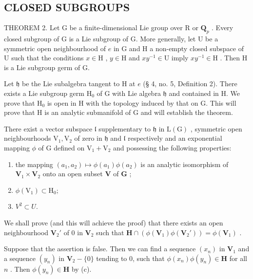 \subsection{CLOSED SUBGROUPS}

THEOREM 2. Let G be a finite-dimensional Lie group over R or \(\mathbf{Q}_{p}\) . Every closed subgroup of G is a Lie subgroup of G. More generally, let U be a symmetric open neighbourhood of \(e\) in G and H a non-empty closed subspace of U such that the conditions \(x \in \mathrm{H}\) , \(y \in \mathrm{H}\) and \(xy^{-1} \in \mathrm{U}\) imply \(xy^{-1} \in \mathrm{H}\) . Then H is a Lie subgroup germ of G.

Let \(\mathfrak{h}\) be the Lie subalgebra tangent to H at \(e\) (§ 4, no. 5, Definition 2). There exists a Lie subgroup germ \(\mathrm{H}_0\) of G with Lie algebra \(\mathfrak{h}\) and contained in H. We prove that \(\mathrm{H}_0\) is open in H with the topology induced by that on G. This will prove that H is an analytic submanifold of G and will establish the theorem.

There exist a vector subspace \(\mathfrak{l}\) supplementary to \(\mathfrak{h}\) in \(\mathrm{L}(\mathrm{G})\) , symmetric open neighbourhoods \(\mathrm{V}_1, \mathrm{V}_2\) of zero in \(\mathfrak{h}\) and \(\mathfrak{l}\) respectively and an exponential mapping \(\phi\) of \(\mathrm{G}\) defined on \(\mathrm{V}_1 + \mathrm{V}_2\) and possessing the following properties:

\begin{enumerate}
\def\labelenumi{(\alph{enumi})}
\item
  the mapping \((a_{1}, a_{2}) \mapsto \phi(a_{1})\phi(a_{2})\) is an analytic isomorphism of \(\mathbf{V}_{1} \times \mathbf{V}_{2}\) onto an open subset \(\mathbf{V}\) of \(\mathbf{G}\) ;
\item
  \(\phi (\mathrm{V}_1)\subset \mathrm{H}_0;\)
\item
  \(V^{2} \subset U.\)
\end{enumerate}

We shall prove (and this will achieve the proof) that there exists an open neighbourhood \(\mathbf{V}_2'\) of 0 in \(\mathbf{V}_2\) such that \(\mathbf{H} \cap (\phi(\mathbf{V}_1)\phi(\mathbf{V}_2')) = \phi(\mathbf{V}_1)\) .

Suppose that the assertion is false. Then we can find a sequence \((x_{n})\) in \(\mathbf{V}_1\) and a sequence \((y_{n})\) in \(\mathbf{V}_2 - \{0\}\) tending to 0, such that \(\phi (x_n)\phi (y_n)\in \mathbf{H}\) for all \(n\) . Then \(\phi (y_n)\in \mathbf{H}\) by (c).

